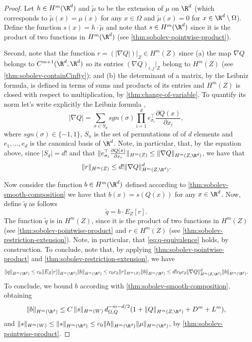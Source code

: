 \begin{proof}
Let $h \in H^m(\R^d)$ and $\tilde{\mu}$ to be the extension of $\mu$ on $\R^d$ (which corresponds to $\tilde{\mu}(x) = \mu(x)$ for any $x \in \Omega$ and $\tilde{\mu}(x) = 0$ for $x \in \R^d \setminus \Omega$). Define the function $s(x) = h \cdot \tilde{\mu}$ and note that $s \in H^m(\R^d)$ since it is the product of two functions in $H^m(\R^d)$ (see \cref{thm:sobolev-pointwise-product}).

Second, note that the function $r = (|\nabla Q|)|_Z \in H^m(Z)$ since (a) the map $\nabla Q$ belongs to $C^{m+1}(\R^d, \R^d)$ so its entries $(\nabla Q)_{i,j}|_Z$ belong to $H^m(Z)$ (see \cref{thm:sobolev-containCinfty}); and (b) the determinant of a matrix, by the Leibniz formula, is defined in terms of sums and products of its entries and $H^m(Z)$ is closed with respect to multiplication, by \cref{thm:change-of-variable}. To quantify its norm let's write explicitly the Leibniz formula \cite{trefethen1997numerical},
$$ |\nabla Q| = \sum_{\sigma \in S_d} sgn(\sigma) \prod_{i=1}^d e_{\sigma_i}^\top\frac{\partial Q(x)}{\partial x_i},$$
where $sgn(\sigma) \in \{-1,1\}$, $S_n$ is the set of permutations of of $d$ elements and $e_1,\dots,e_d$ is the canonical basis of $\R^d$. Note, in particular, that, by the equation above, since $|S_d| = d!$ and that $\|e_{\sigma_i}^\top\frac{\partial Q(x)}{\partial x_i}\|_{H^m(Z)} \leq \|\nabla Q\|_{H^m(Z,\R^d)}$, we have that
$$\|r\|_{H^m(Z)} \leq d! \|\nabla Q\|_{H^m(Z, \R^d)}^d.$$

Now consider the function $b \in H^m(\R^d)$ defined according to \cref{thm:sobolev-smooth-composition} we have that $b(x) = s(Q(x))$ for any $x \in \R^d$. Now, define $\tilde{q}$ as follows
$$ \tilde{q} = b  \cdot  E_Z[r].$$
The function $\tilde{q}$ is in $H^m(Z)$, since it is the product of two functions in $H^m(Z)$ (see \cref{thm:sobolev-pointwise-product} and $r \in H^m(Z)$ (see \cref{thm:sobolev-restriction-extension}). Note, in particular, that \cref{eq:q-equivalence} holds, by construction. To conclude, note that, by applying \cref{thm:sobolev-pointwise-product} and \cref{thm:sobolev-restriction-extension}, we have
$$ \|q\|_{H^m(\R^d)} \leq c_0 \|E_Z[r]\|_{H^m(\R^d)} \|b\|_{H^m(\R^d)} \leq c_0 c_2 \|r\|_{H^m(Z)} \|b\|_{H^m(\R^d)} \leq d! c_0 c_2 \|\nabla Q\|_{H^m(Z,\R^d)}^d \|b\|_{H^m(\R^d)}.$$
To conclude, we bound $b$ according with \cref{thm:sobolev-smooth-composition}, obtaining
$$\|b\|_{H^m(\R^d)} \leq C\, \|s\|_{H^m(W)}\, d_{\Omega, Q}^{-m-d/2}(1 + \|Q\|_{H^m(Z, \R^d)} + D^m + L^m), $$
and $\|s\|_{H^m(W)} \leq \|s\|_{H^m(\R^d)} \leq c_0 \|h\|_{H^m(\R^d)}\|\mu\|_{H^m(\R^d)}$, by \cref{thm:sobolev-pointwise-product}.
\end{proof}

